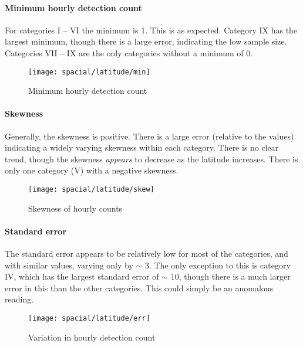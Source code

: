 \paragraph{Minimum hourly detection count\\}
For categories I -- VI the minimum is 1. This is as expected. Category IX has the largest minimum, though there is a large error, indicating the low sample size. Categories VII -- IX are the only categories without a minimum of 0. 
\begin{figure}[h!]
	\centering
	\texttt{[image: spacial/latitude/min]}
	\caption{Minimum hourly detection count
		\label{fig:spac:lat:min}}
\end{figure}
\paragraph{Skewness\\}
Generally, the skewness is positive. There is a large error (relative to the values) indicating a widely varying skewness within each category. There is no clear trend, though the skewness {\it appears} to decrease as the latitude increases. There is only one category (V) with a negative skewness.
\begin{figure}[h!]
	\centering
	\texttt{[image: spacial/latitude/skew]}
	\caption{Skewness of hourly counts
		\label{fig:spac:lat:skew}}
\end{figure}
\paragraph{Standard error\\}
The standard error appears to be relatively low for most of the categories, and with similar values, varying only by $\sim$ 3. The only exception to this is category IV, which has the largest standard error of $\sim$ 10, though there is a much larger error in this than the other categories. This could simply be an anomalous reading.
\begin{figure}[h!]
	\centering
	\texttt{[image: spacial/latitude/err]}
	\caption{Variation in hourly detection count 
		\label{fig:spac:lat:err}}
\end{figure}
